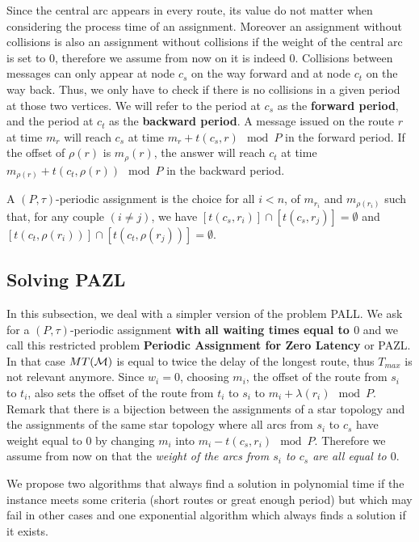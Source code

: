 \documentclass[a4paper,10pt]{article}
\begin{document}
      Since the central arc appears in every route, its value do not matter when considering the process time of an assignment.
      Moreover an assignment without collisions is also an assignment without collisions if the weight of the central arc 
      is set to $0$, therefore we assume from now on it is indeed $0$.
      Collisions between messages can only appear at node $c_s$ on the way forward and at node $c_t$ on the way back.
      Thus, we only have to check if there is no collisions in a given period at those two vertices.
      We will refer to the period at $c_s$ as the {\bf forward period}, and the period at $c_t$ as the {\bf backward period}. A message issued on the route $r$ at time $m_r$ will reach $c_s$ at time $m_{r} + t(c_s,r) \mod P$ in the forward period. If the offset of $\rho(r)$ is $m_\rho(r)$, the answer will reach $c_t$ at time $m_{\rho(r)} + t(c_t,\rho(r))\mod P$ in the backward period.

      A $(P,\tau)$-periodic assignment is the choice for all $i < n$, of $m_{r_i}$ and $m_{\rho(r_i)}$ such that, for any couple $(i\neq j)$, we have $[t(c_s,r_{i})] \cap [t(c_s,r_{j})] = \emptyset$ and $[t(c_t,\rho(r_i))] \cap [t(c_t,\rho(r_j))] = \emptyset$.

      

  \subsection{Solving PAZL}
  
  In this subsection, we deal with a simpler version of the problem PALL.
  We ask for a $(P,\tau)$-periodic assignment {\bf with all waiting times equal to $0$} and we call this restricted problem {\bf Periodic Assignment for Zero Latency} or PAZL. 
  In that case $MT({\cal M})$ is equal to twice the delay of the longest route, thus $T_{max}$ is not relevant anymore. 
  Since $w_i=0$, choosing $m_i$, the offset of the route from $s_i$ to $t_i$, also sets the offset of the route from $t_i$ to $s_i$ to $m_i + \lambda(r_i) \mod P$.
  Remark that there is a bijection between the assignments of a star topology and the 
  assignments of the same star topology where all arcs from $s_i$ to $c_s$ have weight equal to $0$ by changing $m_i$ into $m_i - t(c_s,r_i) \mod P$. Therefore we assume from now on that the \emph{weight of the arcs from $s_i$ to $c_s$ are all equal to $0$}.
  
  We propose two algorithms that always find a solution in polynomial time if the instance meets some criteria (short routes or great enough period) but which may fail in other cases and one exponential algorithm which always finds a solution if it exists.
  
\end{document}
